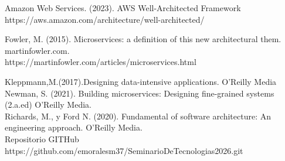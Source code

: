 \documentclass[
	article,			%
	11pt,				%
	oneside,			%
	a4paper,			%
	english,			%
	brazil,				%
	sumario=tradicional
	]{abntex2}
\begin{document}
Amazon Web Services. (2023). AWS Well-Architected Framework \\
https://aws.amazon.com/architecture/well-architected/

Fowler, M. (2015). Microservices: a definition of this new architectural them. martinfowler.com.  \\
https://martinfowler.com/articles/microservices.html

Kleppmann,M.(2017).Designing data-intensive applications.  O'Reilly Media \\
Newman, S. (2021). Building microservices: Designing fine-grained systems (2.a.ed) O'Reilly Media.  \\

Richards, M., y Ford N. (2020). Fundamental of software architecture: An engineering approach. O'Reilly Media.  \\

Repositorio GITHub https://github.com/emoralesm37/SeminarioDeTecnologias2026.git

%
%








\end{document}
